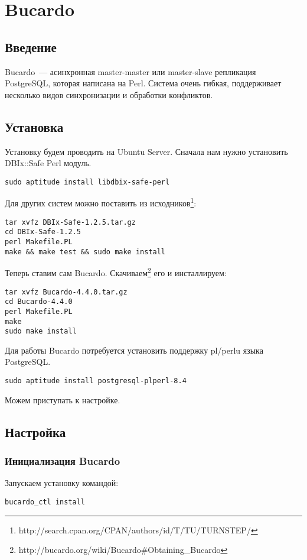 \section{Bucardo}
\subsection{Введение}
Bucardo~--- асинхронная master-master или master-slave репликация PostgreSQL, которая написана на Perl. 
Система очень гибкая, поддерживает несколько видов синхронизации и обработки конфликтов.

\subsection{Установка}
Установку будем проводить на Ubuntu Server. Сначала нам нужно установить DBIx::Safe Perl модуль.
\begin{lstlisting}[label=lst:bucardo1,caption=Установка]
sudo aptitude install libdbix-safe-perl
\end{lstlisting}

Для других систем можно поставить из исходников\footnote{http://search.cpan.org/CPAN/authors/id/T/TU/TURNSTEP/}:
\begin{lstlisting}[label=lst:bucardo2,caption=Установка]
tar xvfz DBIx-Safe-1.2.5.tar.gz
cd DBIx-Safe-1.2.5
perl Makefile.PL
make && make test && sudo make install
\end{lstlisting}

Теперь ставим сам Bucardo. Скачиваем\footnote{http://bucardo.org/wiki/Bucardo\#Obtaining\_Bucardo} его и инсталлируем:
\begin{lstlisting}[label=lst:bucardo3,caption=Установка]
tar xvfz Bucardo-4.4.0.tar.gz
cd Bucardo-4.4.0
perl Makefile.PL
make
sudo make install
\end{lstlisting}

Для работы Bucardo потребуется установить поддержку pl/perlu языка PostgreSQL.
\begin{lstlisting}[label=lst:bucardo4,caption=Установка]
sudo aptitude install postgresql-plperl-8.4
\end{lstlisting}

Можем приступать к настройке.

\subsection{Настройка}
\subsubsection{Инициализация Bucardo}
Запускаем установку командой:
\begin{lstlisting}[label=lst:bucardo5,caption=Инициализация Bucardo]
bucardo_ctl install
\end{lstlisting}

